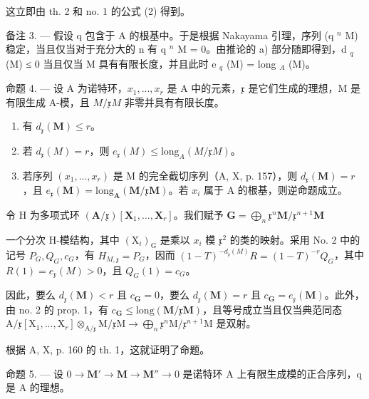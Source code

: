 这立即由 th. 2 和 no. 1 的公式 (2) 得到。

备注 3. --- 假设 q 包含于 A 的根基中。于是根据 Nakayama 引理，序列 (q \(^{n}\) M) 稳定，当且仅当对于充分大的 n 有 q \(^{n}\) M = 0。由推论的 a) 部分随即得到，d \(_{q}\) (M) ≤ 0 当且仅当 M 具有有限长度，并且此时 e \(_{q}\) (M) = long \(_{A}\) (M)。

命题 4. — 设 A 为诺特环，\(x_{1},...,x_{r}\) 是 A 中的元素，\(\mathfrak{x}\) 是它们生成的理想，M 是有限生成 A-模，且 \(M/\mathfrak{x}M\) 非零并具有有限长度。

\begin{enumerate}
\def\labelenumi{\alph{enumi})}
\item
  有 \(d_{\mathfrak{x}}(\mathbf{M}) \leqslant r\)。
\item
  若 \(d_{\mathfrak{x}}(M) = r\)，则 \(e_{\mathfrak{x}}(M) \leqslant \text{long}_{A}(M/\mathfrak{x}M)\)。
\item
  若序列 \((x_{1},...,x_{r})\) 是 M 的完全截切序列（A, X, p. 157），则 \(d_{\mathfrak{x}}(\mathbf{M}) = r\)，且 \(e_{\mathfrak{x}}(\mathbf{M}) = \text{long}_{\mathbf{A}}(\mathbf{M}/\mathfrak{x}\mathbf{M})\)。若 \(x_{i}\) 属于 A 的根基，则逆命题成立。
\end{enumerate}

令 H 为多项式环 \((\mathbf{A} / \mathfrak{x})[\mathbf{X}_1,\dots ,\mathbf{X}_r]\)。我们赋予 \(\mathbf{G} = \bigoplus_{n}\mathfrak{x}^{n}\mathbf{M} / \mathfrak{x}^{n + 1}\mathbf{M}\)

一个分次 H-模结构，其中 \((\mathrm{X}_{i})_{\mathrm{G}}\) 是乘以 \(x_{i}\) 模 \(\mathfrak{x}^{2}\) 的类的映射。采用 No. 2 中的记号 \(P_{G}, Q_{G}, c_{G}\)，有 \(H_{M,\mathfrak{x}} = P_{G}\)，因而 \((1 - T)^{-d_{\mathfrak{x}}(M)}R = (1 - T)^{-r}Q_{G}\)，其中 \(R(1) = e_{\mathfrak{x}}(M) > 0\)，且 \(Q_{G}(1) = c_{G}\)。

因此，要么 \(d_{\mathfrak{x}}(\mathbf{M}) < r\) 且 \(c_{\mathbf{G}} = 0\)，要么 \(d_{\mathfrak{x}}(\mathbf{M}) = r\) 且 \(c_{\mathbf{G}} = e_{\mathfrak{x}}(\mathbf{M})\)。此外，由 no. 2 的 prop. 1，有 \(c_{\mathbf{G}} \leqslant \text{long}(\mathbf{M}/\mathfrak{x}\mathbf{M})\)，且等号成立当且仅当典范同态 \(\mathrm{A}/\mathfrak{x}[\mathrm{X}_{1}, ..., \mathrm{X}_{r}] \otimes_{\mathrm{A}/\mathfrak{x}} \mathrm{M}/\mathfrak{x}\mathrm{M} \to \bigoplus_{n}\mathfrak{x}^{n}\mathrm{M}/\mathfrak{x}^{n+1}\mathrm{M}\) 是双射。

根据 A, X, p. 160 的 th. 1，这就证明了命题。

命题 5. --- 设 \(0 \to \mathbf{M}' \to \mathbf{M} \to \mathbf{M}'' \to 0\) 是诺特环 A 上有限生成模的正合序列，q 是 A 的理想。

